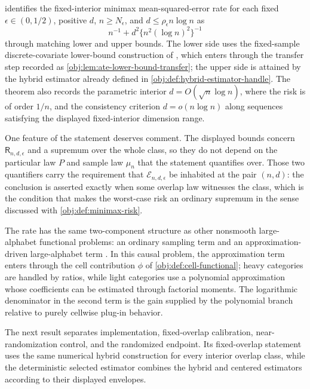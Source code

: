 \documentclass[11pt]{article}
\begin{document}
 identifies the fixed-interior minimax mean-squared-error rate for each fixed \(\epsilon\in(0,1/2)\), positive \(d\), \(n\ge N_\epsilon\), and \(d\le\rho_\epsilon n\log n\) as
\[
n^{-1}+d^2\{n^2(\log n)^2\}^{-1}
\]
through matching lower and upper bounds. The lower side uses the fixed-sample discrete-covariate lower-bound construction of \citet{ZengBalakrishnanHanKennedy2024}, which enters through the transfer step recorded as \cref{obj:lem:ate-lower-bound-transfer}; the upper side is attained by the hybrid estimator already defined in \cref{obj:def:hybrid-estimator-handle}. The theorem also records the parametric interior \(d=O(\sqrt n\log n)\), where the risk is of order \(1/n\), and the consistency criterion \(d=o(n\log n)\) along sequences satisfying the displayed fixed-interior dimension range.

One feature of the statement deserves comment. The displayed bounds concern \(\mathsf R_{n,d,\epsilon}\) and a supremum over the whole class, so they do not depend on the particular law \(P\) and sample law \(\mu_n\) that the statement quantifies over. Those two quantifiers carry the requirement that \(\mathcal E_{n,d,\epsilon}\) be inhabited at the pair \((n,d)\): the conclusion is asserted exactly when some overlap law witnesses the class, which is the condition that makes the worst-case risk an ordinary supremum in the sense discussed with \cref{obj:def:minimax-risk}.

The rate has the same two-component structure as other nonsmooth large-alphabet functional problems: an ordinary sampling term and an approximation-driven large-alphabet term \citep{JiaoVenkatHanWeissman2015,WuYang2016,HanJiaoWeissman2020}. In this causal problem, the approximation term enters through the cell contribution \(\phi\) of \cref{obj:def:cell-functional}; heavy categories are handled by ratios, while light categories use a polynomial approximation whose coefficients can be estimated through factorial moments. The logarithmic denominator in the second term is the gain supplied by the polynomial branch relative to purely cellwise plug-in behavior.

The next result separates implementation, fixed-overlap calibration, near-randomization control, and the randomized endpoint. Its fixed-overlap statement uses the same numerical hybrid construction for every interior overlap class, while the deterministic selected estimator combines the hybrid and centered estimators according to their displayed envelopes.
\end{document}
